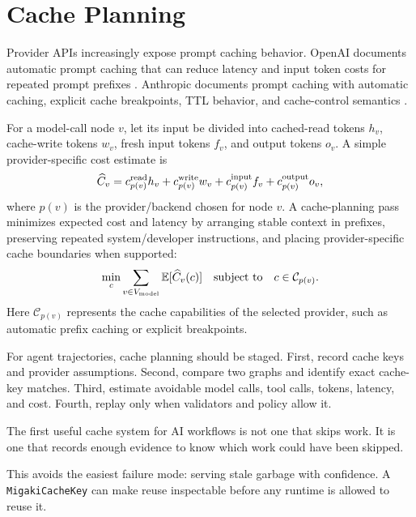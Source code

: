 \section{Cache Planning}

Provider APIs increasingly expose prompt caching behavior. OpenAI documents automatic prompt caching that can reduce latency and input token costs for repeated prompt prefixes \citep{openai_prompt_caching}. Anthropic documents prompt caching with automatic caching, explicit cache breakpoints, TTL behavior, and cache-control semantics \citep{anthropic_prompt_caching,anthropic_costs}.

For a model-call node $v$, let its input be divided into cached-read tokens $h_v$, cache-write tokens $w_v$, fresh input tokens $f_v$, and output tokens $o_v$. A simple provider-specific cost estimate is
\begin{equation}
\widehat{C}_v = c^{\mathrm{read}}_{p(v)} h_v + c^{\mathrm{write}}_{p(v)} w_v + c^{\mathrm{input}}_{p(v)} f_v + c^{\mathrm{output}}_{p(v)} o_v,
\label{eq:cache_cost}
\end{equation}
where $p(v)$ is the provider/backend chosen for node $v$. A cache-planning pass minimizes expected cost and latency by arranging stable context in prefixes, preserving repeated system/developer instructions, and placing provider-specific cache boundaries when supported:
\begin{equation}
\min_c \sum_{v \in V_{\mathrm{model}}} \mathbb{E}[\widehat{C}_v(c)]
\quad \text{subject to} \quad c \in \mathcal{C}_{p(v)}.
\end{equation}
Here $\mathcal{C}_{p(v)}$ represents the cache capabilities of the selected provider, such as automatic prefix caching or explicit breakpoints.

For agent trajectories, cache planning should be staged. First, record cache keys and provider assumptions. Second, compare two graphs and identify exact cache-key matches. Third, estimate avoidable model calls, tool calls, tokens, latency, and cost. Fourth, replay only when validators and policy allow it.

\begin{principle}
The first useful cache system for AI workflows is not one that skips work. It is one that records enough evidence to know which work could have been skipped.
\end{principle}

This avoids the easiest failure mode: serving stale garbage with confidence. A \texttt{MigakiCacheKey} can make reuse inspectable before any runtime is allowed to reuse it.

